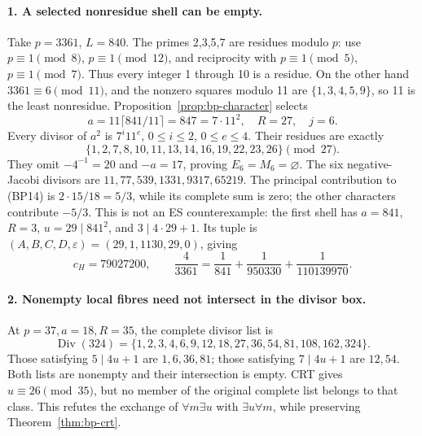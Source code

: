 \paragraph{1. A selected nonresidue shell can be empty.}
Take \(p=3361\), \(L=840\). The primes 2,3,5,7 are residues
modulo \(p\): use \(p\equiv1\pmod8\), \(p\equiv1\pmod{12}\),
and reciprocity with \(p\equiv1\pmod5\), \(p\equiv1\pmod7\).
Thus every integer 1 through 10 is a residue. On the other hand
\(3361\equiv6\pmod{11}\), and the nonzero squares modulo 11
are \(\{1,3,4,5,9\}\), so 11 is the least nonresidue.
Proposition~\ref{prop:bp-character} selects
\[
 a=11\lceil841/11\rceil=847=7\cdot11^2,\quad R=27,\quad j=6.
\]
Every divisor of \(a^2\) is \(7^i11^e\), \(0\le i\le2\),
\(0\le e\le4\). Their residues are exactly
\[
 \{1,2,7,8,10,11,13,14,16,19,22,23,26\}\pmod{27}.
\]
They omit \(-4^{-1}=20\) and \(-a=17\), proving
\(E_6=M_6=\varnothing\). The six negative-Jacobi divisors are
\(11,77,539,1331,9317,65219\). The principal contribution
to (BP14) is \(2\cdot15/18=5/3\), while its complete sum is
zero; the other characters contribute \(-5/3\).
This is not an ES counterexample: the first shell has \(a=841\),
\(R=3\), \(u=29\mid841^2\), and \(3\mid4\cdot29+1\).
Its tuple is \((A,B,C,D,\varepsilon)=(29,1,1130,29,0)\), giving
\[
 c_H=79027200,\qquad
 \frac4{3361}=\frac1{841}+\frac1{950330}+\frac1{110139970}.
\]

\paragraph{2. Nonempty local fibres need not intersect in the divisor box.}
At \(p=37,a=18,R=35\), the complete divisor list is
\[
 \operatorname{Div}(324)=
 \{1,2,3,4,6,9,12,18,27,36,54,81,108,162,324\}.
\]
Those satisfying \(5\mid4u+1\) are \(1,6,36,81\); those
satisfying \(7\mid4u+1\) are \(12,54\). Both lists are nonempty
and their intersection is empty. CRT gives \(u\equiv26\pmod{35}\),
but no member of the original complete list belongs to that class.
This refutes the exchange of \(\forall m\exists u\) with
\(\exists u\forall m\), while preserving Theorem~\ref{thm:bp-crt}.

